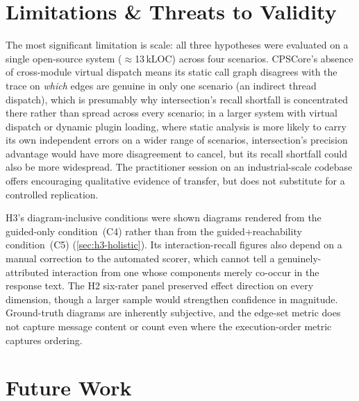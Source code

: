 \section{Limitations \& Threats to Validity}

The most significant limitation is scale: all three hypotheses were
evaluated on a single open-source system ($\approx$13\,kLOC) across four
scenarios. CPSCore's absence of cross-module virtual dispatch means its
static call graph disagrees with the trace on \emph{which} edges are
genuine in only one scenario (an indirect thread dispatch), which is
presumably why intersection's recall shortfall is concentrated there
rather than spread across every scenario; in a larger system with
virtual dispatch or dynamic plugin loading, where static analysis is
more likely to carry its own independent errors on a wider range of
scenarios, intersection's precision advantage would have more
disagreement to cancel, but its recall shortfall could also be more
widespread. The practitioner session on an industrial-scale codebase
offers encouraging qualitative evidence of transfer, but does not
substitute for a controlled replication.

H3's diagram-inclusive conditions were shown diagrams rendered from the
guided-only condition~(C4) rather than from the
guided+reachability condition~(C5) (\cref{sec:h3-holistic}). Its interaction-recall figures also
depend on a manual correction to the automated scorer, which cannot
tell a genuinely-attributed interaction from one whose components merely
co-occur in the response text. The H2 six-rater panel preserved effect direction on
every dimension, though a larger sample would strengthen confidence in
magnitude. Ground-truth diagrams are inherently subjective, and the
edge-set metric does not capture message content or count even where
the execution-order metric captures ordering.

\section{Future Work}\label{sec:future-work}

